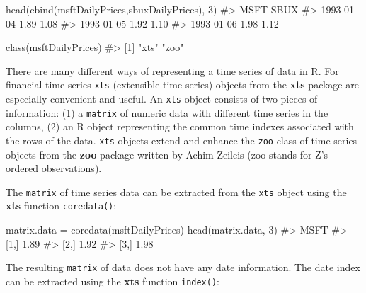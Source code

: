 \documentclass[
  letterpaper,
  DIV=11,
  numbers=noendperiod]{scrreprt}
\newenvironment{Shaded}{\begin{snugshade}}{\end{snugshade}}
\newcommand{\CommentTok}[1]{\textcolor[rgb]{0.37,0.37,0.37}{#1}}
\newcommand{\DecValTok}[1]{\textcolor[rgb]{0.68,0.00,0.00}{#1}}
\newcommand{\FunctionTok}[1]{\textcolor[rgb]{0.28,0.35,0.67}{#1}}
\newcommand{\NormalTok}[1]{\textcolor[rgb]{0.00,0.23,0.31}{#1}}
\newcommand{\OtherTok}[1]{\textcolor[rgb]{0.00,0.23,0.31}{#1}}
\theoremstyle{definition}
\theoremstyle{definition}
\theoremstyle{remark}
\begin{document}
\begin{Shaded}
\begin{Highlighting}[]
\FunctionTok{head}\NormalTok{(}\FunctionTok{cbind}\NormalTok{(msftDailyPrices,sbuxDailyPrices), }\DecValTok{3}\NormalTok{)}
\CommentTok{\#\textgreater{}            MSFT SBUX}
\CommentTok{\#\textgreater{} 1993{-}01{-}04 1.89 1.08}
\CommentTok{\#\textgreater{} 1993{-}01{-}05 1.92 1.10}
\CommentTok{\#\textgreater{} 1993{-}01{-}06 1.98 1.12}
\end{Highlighting}
\end{Shaded}

\begin{Shaded}
\begin{Highlighting}[]
\FunctionTok{class}\NormalTok{(msftDailyPrices)}
\CommentTok{\#\textgreater{} [1] "xts" "zoo"}
\end{Highlighting}
\end{Shaded}

There are many different ways of representing a time series of data in
R. For financial time series \texttt{xts} (extensible time series)
objects from the \textbf{xts} package are especially convenient and
useful. An \texttt{xts} object consists of two pieces of information:
(1) a \texttt{matrix} of numeric data with different time series in the
columns, (2) an R object representing the common time indexes associated
with the rows of the data. \texttt{xts} objects extend and enhance the
\texttt{zoo} class of time series objects from the \textbf{zoo} package
written by Achim Zeileis (zoo stands for Z's ordered observations).

The \texttt{matrix} of time series data can be extracted from the
\texttt{xts} object using the \textbf{xts} function \texttt{coredata()}:

\begin{Shaded}
\begin{Highlighting}[]
\NormalTok{matrix.data }\OtherTok{=} \FunctionTok{coredata}\NormalTok{(msftDailyPrices)}
\FunctionTok{head}\NormalTok{(matrix.data, }\DecValTok{3}\NormalTok{)}
\CommentTok{\#\textgreater{}      MSFT}
\CommentTok{\#\textgreater{} [1,] 1.89}
\CommentTok{\#\textgreater{} [2,] 1.92}
\CommentTok{\#\textgreater{} [3,] 1.98}
\end{Highlighting}
\end{Shaded}

The resulting \texttt{matrix} of data does not have any date
information. The date index can be extracted using the \textbf{xts}
function \texttt{index()}:
\end{document}

